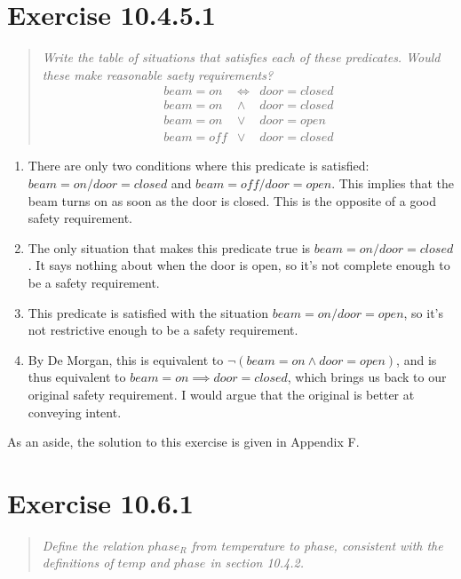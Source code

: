 \documentclass[10pt]{article}
\begin{document}
\section{Exercise 10.4.5.1}
\begin{quote}
  {\it Write the table of situations that satisfies each of these predicates.  Would these make
    reasonable saety requirements?}
    \begin{eqnarray}
      beam = on  & \iff  & door = closed \\
      beam = on  & \land & door = closed \\
      beam = on  & \lor  & door = open   \\
      beam = off & \lor  & door = closed
    \end{eqnarray}
\end{quote}
\begin{enumerate}
\item There are only two conditions where this predicate is satisfied: $beam=on/door=closed$ and
  $beam=off/door=open$.  This implies that the beam turns on as soon as the door is closed.  This is
  the opposite of a good safety requirement.

\item The only situation that makes this predicate true is $beam=on/door=closed$.  It says nothing
  about when the door is open, so it's not complete enough to be a safety requirement.

\item This predicate is satisfied with the situation $beam=on/door=open$, so it's not restrictive
  enough to be a safety requirement.

\item By De Morgan, this is equivalent to $\lnot (beam=on \land door=open)$, and is thus equivalent
  to $beam=on \implies door=closed$, which brings us back to our original safety requirement.  I
  would argue that the original is better at conveying intent.
\end{enumerate}

As an aside, the solution to this exercise is given in Appendix F.


\section{Exercise 10.6.1}
\begin{quote}
  {\it Define the relation $phase_R$ from temperature to phase, consistent with the definitions of
    $temp$ and $phase$ in section 10.4.2.  }
\end{quote}
\end{document}
